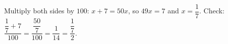 Multiply both sides by $100$: $x+7=50x$, so $49x=7$ and $x=\boxed{\dfrac17}$. Check: $\dfrac{\dfrac17+7}{100}=\dfrac{\dfrac{50}{7}}{100}=\dfrac1{14}=\dfrac{\dfrac17}{2}$.
